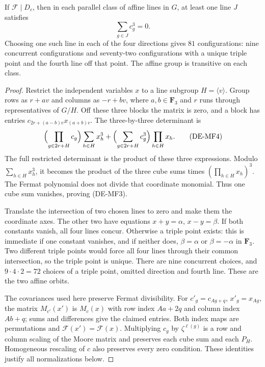 \begin{lemma}
\label{lem:DE-Fermat-affine-lines}
If \(\mathcal F\mid D_c\), then in each parallel class of
affine lines in \(G\), at least one line \(J\) satisfies
\[
                         \sum_{g\in J}c_g^3=0.       \tag{DE-MF3}
\]
Choosing one such line in each of the four directions gives
\(81\) configurations: nine concurrent configurations and
seventy-two configurations with a unique triple point and
the fourth line off that point. The affine group is transitive
on each class.
\end{lemma}
\begin{proof}
Restrict the independent variables \(x\) to a line subgroup
\(H=\langle v\rangle\). Group rows as \(r+av\) and columns
as \(-r+bv\), where \(a,b\in\mathbf F_3\) and \(r\) runs
through representatives of \(G/H\). Off these three blocks
the matrix is zero, and a block has entries
\(c_{2r+(a-b)v}x_{(a+b)v}\). The three-by-three determinant is
\[
 \Bigl(\prod_{g\in2r+H}c_g\Bigr)\sum_{h\in H}x_h^3
 +\Bigl(\sum_{g\in2r+H}c_g^3\Bigr)\prod_{h\in H}x_h.
 \tag{DE-MF4}
\]
The full restricted determinant is the product of these three
expressions. Modulo \(\sum_{h\in H}x_h^3\), it becomes the
product of the three cube sums times \((\prod_{h\in H}x_h)^3\).
The Fermat polynomial does not divide that coordinate monomial.
Thus one cube sum vanishes, proving (DE-MF3).

Translate the intersection of two chosen lines to zero and
make them the coordinate axes. The other two have equations
\(x+y=\alpha\), \(x-y=\beta\). If both constants vanish,
all four lines concur. Otherwise a triple point exists:
this is immediate if one constant vanishes, and if neither
does, \(\beta=\alpha\) or \(\beta=-\alpha\) in \(\mathbf F_3\).
Two different triple points would force all four lines through
their common intersection, so the triple point is unique.
There are nine concurrent choices, and
\(9\cdot4\cdot2=72\) choices of a triple point, omitted
direction and fourth line. These are the two affine orbits.

The covariances used here preserve Fermat divisibility. For
\(c'_g=c_{Ag+q}\), \(x'_g=x_{Ag}\), the matrix
\(M_{c'}(x')\) is \(M_c(x)\) with row index \(Aa+2q\)
and column index \(Ab+q\); sums and differences give the
claimed entries. Both index maps are permutations and
\(\mathcal F(x')=\mathcal F(x)\). Multiplying \(c_g\) by
\(\zeta^{\ell(g)}\) is a row and column scaling of the Moore
matrix and preserves each cube sum and each \(P_H\).
Homogeneous rescaling of \(c\) also preserves every zero
condition. These identities justify all normalizations below.
\end{proof}


